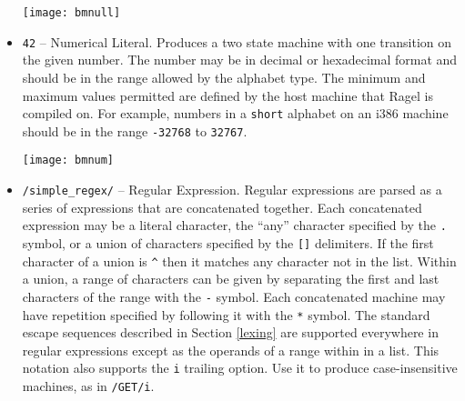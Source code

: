 \documentclass[letterpaper,11pt,oneside]{book}
\begin{document}
\begin{itemize}
\begin{comment}
\begin{verbatim}
main := '';
\end{verbatim}
\end{comment}

\begin{center}
\texttt{[image: bmnull]}
\end{center}

\item \verb|42| -- Numerical Literal. Produces a two state machine with one
transition on the given number. The number may be in decimal or hexadecimal
format and should be in the range allowed by the alphabet type. The minimum and
maximum values permitted are defined by the host machine that Ragel is compiled
on. For example, numbers in a \verb|short| alphabet on an i386 machine should
be in the range \verb|-32768| to \verb|32767|.

\begin{comment}
\begin{verbatim}
main := 42;
\end{verbatim}
\end{comment}

\begin{center}
\texttt{[image: bmnum]}
\end{center}

\item \verb|/simple_regex/| -- Regular Expression. Regular expressions are
parsed as a series of expressions that are concatenated together. Each
concatenated expression
may be a literal character, the ``any'' character specified by the \verb|.|
symbol, or a union of characters specified by the \verb|[]| delimiters. If the
first character of a union is \verb|^| then it matches any character not in the
list. Within a union, a range of characters can be given by separating the first
and last characters of the range with the \verb|-| symbol. Each
concatenated machine may have repetition specified by following it with the
\verb|*| symbol. The standard escape sequences described in Section
\ref{lexing} are supported everywhere in regular expressions except as the
operands of a range within in a list. This notation also supports the \verb|i|
trailing option. Use it to produce case-insensitive machines, as in \verb|/GET/i|.


\end{itemize}
\end{document}
